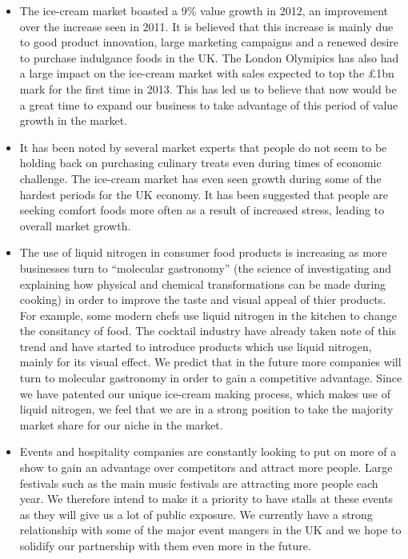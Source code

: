 \documentclass{article}
\begin{document}
  \begin{itemize}
  \item The ice-cream market boasted a 9\% value growth in 2012, an improvement over the increase seen in 2011. It is believed that this increase is mainly due to good product innovation, large marketing campaigns and a renewed desire to purchase indulgance foods in the UK. The London Olymipics has also had a large impact on the ice-cream market with sales expected to top the £1bn mark for the first time in 2013. This has led us to believe that now would be a great time to expand our business to take advantage of this period of value growth in the market.

  \item It has been noted by several market experts that people do not seem to be holding back on purchasing culinary treats even during times of economic challenge. The ice-cream market has even seen growth during some of the hardest periods for the UK economy. It has been suggested that people are seeking comfort foods more often as a result of increased stress, leading to overall market growth.

  \item The use of liquid nitrogen in consumer food products is increasing as more businesses turn to  ``molecular gastronomy'' (the science of investigating and explaining how physical and chemical transformations can be made during cooking) in order to improve the taste and visual appeal of thier products. For example, some modern chefs use liquid nitrogen in the kitchen to change the consitancy of food. The cocktail industry have already taken note of this trend and have started to introduce products which use liquid nitrogen, mainly for its visual effect. We predict that in the future more companies will turn to molecular gastronomy in order to gain a competitive advantage. Since we have patented our unique ice-cream making process, which makes use of liquid nitrogen, we feel that we are in a strong position to take the majority market share for our niche in the market. 

  \item Events and hospitality companies are constantly looking to put on more of a show to gain an advantage over competitors and attract more people. Large festivals such as the main music festivals are attracting more people each year. We therefore intend to make it a priority to have stalls at these events as they will give us a lot of public exposure. We currently have a strong relationship with some of the major event mangers in the UK and we hope to solidify our partnership with them even more in the future.


\end{itemize}
\end{document}

